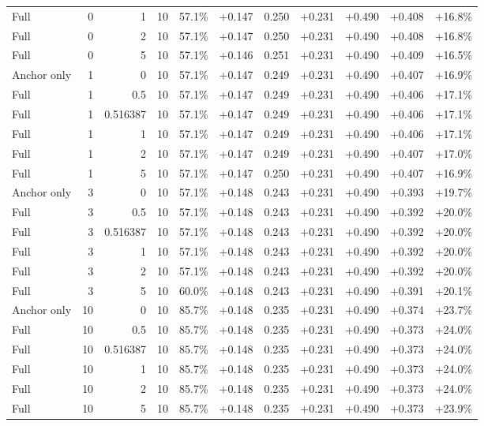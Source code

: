 \begin{table}[htbp]
\begin{tabular}{lrrrccccccc}
Full & 0 & 1 & 10 & 57.1\% & +0.147 & 0.250 & +0.231 & +0.490 & +0.408 & +16.8\% \\
Full & 0 & 2 & 10 & 57.1\% & +0.147 & 0.250 & +0.231 & +0.490 & +0.408 & +16.8\% \\
Full & 0 & 5 & 10 & 57.1\% & +0.146 & 0.251 & +0.231 & +0.490 & +0.409 & +16.5\% \\
Anchor only & 1 & 0 & 10 & 57.1\% & +0.147 & 0.249 & +0.231 & +0.490 & +0.407 & +16.9\% \\
Full & 1 & 0.5 & 10 & 57.1\% & +0.147 & 0.249 & +0.231 & +0.490 & +0.406 & +17.1\% \\
Full & 1 & 0.516387 & 10 & 57.1\% & +0.147 & 0.249 & +0.231 & +0.490 & +0.406 & +17.1\% \\
Full & 1 & 1 & 10 & 57.1\% & +0.147 & 0.249 & +0.231 & +0.490 & +0.406 & +17.1\% \\
Full & 1 & 2 & 10 & 57.1\% & +0.147 & 0.249 & +0.231 & +0.490 & +0.407 & +17.0\% \\
Full & 1 & 5 & 10 & 57.1\% & +0.147 & 0.250 & +0.231 & +0.490 & +0.407 & +16.9\% \\
Anchor only & 3 & 0 & 10 & 57.1\% & +0.148 & 0.243 & +0.231 & +0.490 & +0.393 & +19.7\% \\
Full & 3 & 0.5 & 10 & 57.1\% & +0.148 & 0.243 & +0.231 & +0.490 & +0.392 & +20.0\% \\
Full & 3 & 0.516387 & 10 & 57.1\% & +0.148 & 0.243 & +0.231 & +0.490 & +0.392 & +20.0\% \\
Full & 3 & 1 & 10 & 57.1\% & +0.148 & 0.243 & +0.231 & +0.490 & +0.392 & +20.0\% \\
Full & 3 & 2 & 10 & 57.1\% & +0.148 & 0.243 & +0.231 & +0.490 & +0.392 & +20.0\% \\
Full & 3 & 5 & 10 & 60.0\% & +0.148 & 0.243 & +0.231 & +0.490 & +0.391 & +20.1\% \\
Anchor only & 10 & 0 & 10 & 85.7\% & +0.148 & 0.235 & +0.231 & +0.490 & +0.374 & +23.7\% \\
Full & 10 & 0.5 & 10 & 85.7\% & +0.148 & 0.235 & +0.231 & +0.490 & +0.373 & +24.0\% \\
Full & 10 & 0.516387 & 10 & 85.7\% & +0.148 & 0.235 & +0.231 & +0.490 & +0.373 & +24.0\% \\
Full & 10 & 1 & 10 & 85.7\% & +0.148 & 0.235 & +0.231 & +0.490 & +0.373 & +24.0\% \\
Full & 10 & 2 & 10 & 85.7\% & +0.148 & 0.235 & +0.231 & +0.490 & +0.373 & +24.0\% \\
Full & 10 & 5 & 10 & 85.7\% & +0.148 & 0.235 & +0.231 & +0.490 & +0.373 & +23.9\% \\

\end{tabular}
\end{table}
